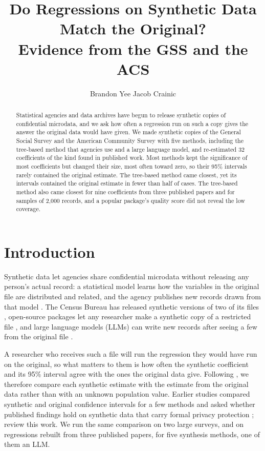 \documentclass[10pt]{article}
\title{\vspace{-1.5em}Do Regressions on Synthetic Data Match the Original?\\Evidence from the GSS and the ACS}
\author{Brandon Yee \qquad Jacob Crainic}
\date{\vspace{-1em}}
\begin{document}
\maketitle
\vspace{-1.5em}

\begin{abstract}
\noindent Statistical agencies and data archives have begun to release synthetic copies of confidential
microdata, and we ask how often a regression run on such a copy gives the answer the original data would
have given. We made synthetic copies of the General Social Survey and the American Community Survey with
five methods, including the tree-based method that agencies use and a large language model, and
re-estimated 32 coefficients of the kind found in published work. Most methods kept the significance of
most coefficients but changed their size, most often toward zero, so their 95\% intervals rarely
contained the original estimate.
The tree-based method came closest, yet its intervals contained the original estimate in fewer than half
of cases. The tree-based method also came closest for nine coefficients from three published papers and for
samples of 2,000 records, and a popular package's quality score did not reveal the low coverage.
\end{abstract}

\section{Introduction}
Synthetic data let agencies share confidential microdata without releasing any person's actual record: a
statistical model learns how the variables in the original file are distributed and related, and the
agency publishes new records drawn from that model \citep{raghunathan2003, reiter2005}. The Census
Bureau has released synthetic versions of two of its files \citep{benedetto2013, kinney2011}, open-source
packages let any researcher make a synthetic copy of a restricted file \citep{nowok2016, patki2016}, and large language
models (LLMs) can write new records after seeing a few from the original file \citep{seedat2024}.

A researcher who receives such a file will run the regression they would have run on the original, so
what matters to them is how often the synthetic coefficient and its 95\% interval agree with the ones the
original data give. Following \citet{nowok2016}, we therefore compare each synthetic estimate with the
estimate from the original data rather than with an unknown population value. Earlier studies compared
synthetic and original confidence intervals for a few methods \citep{karr2006, drechsler2011} and asked
whether published findings hold on synthetic data that carry formal privacy protection
\citep{rosenblatt2023}; \citet{drechsler2024} review this work. We run the same comparison on two large
surveys, and on regressions rebuilt from three published papers, for five synthesis methods, one of them an LLM.
\end{document}
